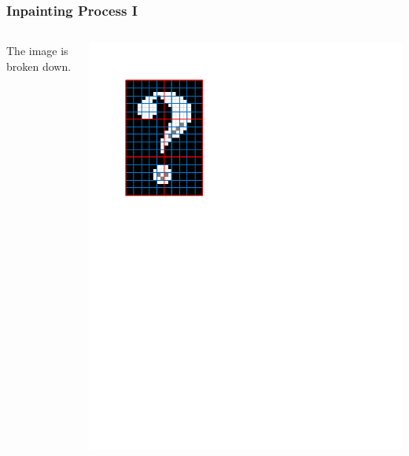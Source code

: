 \documentclass{beamer}
\begin{document}
\begin{frame}
\frametitle{Inpainting Process I}
\begin{columns}
\begin{column}{0.5\textwidth}
The image is broken down.
\end{column}
\begin{column}{0.5\textwidth}
\includegraphics[width=1\textwidth,trim={0 6.5in 4in 0},clip]{regions_and_neighborhoods}
\end{column}
\end{columns}
\end{frame}
\end{document}
